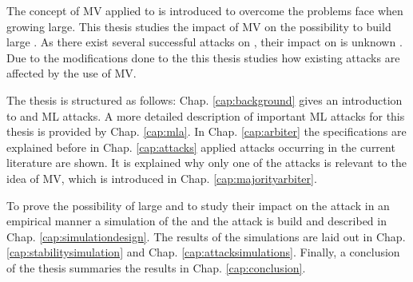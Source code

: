 The concept of \ac{MV} applied to \apufs is introduced to overcome the problems \xpufs face when growing large.
This thesis studies the impact of \ac{MV} on the possibility to build large \xpufs. %
As there exist several successful attacks on \apufs, their impact on \mpuf is unknown \cite{Ganji2016PACPUFs,Ruhrmair2014PUFOverview}.
Due to the modifications done to the \apuf this thesis studies how existing attacks are affected by the use of \ac{MV}.

The thesis is structured as follows: 
Chap. \ref{cap:background} gives an introduction to \pufs and \ac{ML} attacks.
A more detailed description of important \ac{ML} attacks for this thesis is provided by Chap. \ref{cap:mla}. %
In Chap. \ref{cap:arbiter} the \apuf specifications are explained before in Chap. \ref{cap:attacks} applied attacks occurring in the current literature are shown.
It is explained why only one of the attacks is relevant to the idea of \ac{MV}, which is introduced in Chap. \ref{cap:majorityarbiter}. %

To prove the possibility of large \mxpufs and to study their impact on the attack in an empirical manner a simulation of the \apuf and the attack is build and described in Chap. \ref{cap:simulationdesign}. %
The results of the simulations are laid out in Chap. \ref{cap:stabilitysimulation} and Chap. \ref{cap:attacksimulations}.
Finally, a conclusion of the thesis summaries the results in Chap. \ref{cap:conclusion}.


